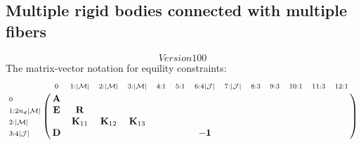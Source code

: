 \documentclass[a4paper,10pt]{article}
\begin{document}
\subsection{Multiple rigid bodies connected with multiple fibers}
\[Version 100\]
The matrix-vector notation for equility constraints:
\begin{equation}\notag
\bordermatrix{
                                        & \scriptstyle{0      }        &   \scriptstyle{1 : |\mathcal{M}|}           &  \scriptstyle{2 : |\mathcal{M}|}           & \scriptstyle{3 : |\mathcal{M}|}            &  \scriptstyle{4 : 1}    & \scriptstyle{5 : 1}    &  \scriptstyle{6:4| \mathcal{J} | }  &  \scriptstyle{7 : | \mathcal{J} |}     &  \scriptstyle{8 : 3} &  \scriptstyle{9:3} & \scriptstyle{10:1}  &  \scriptstyle{11:3}  & \scriptstyle{12:1}  \cr
\scriptstyle{0      }                   &\mathbf{A}                    &                                             &                                            &                                            &                         &                        &                                     &                                        &                      &                    &                     &                      &                     \cr
\scriptstyle{1 : 2n_d|\mathcal{M}|}     &\mathbf{E}                    &   \mathbf{R}                                &                                            &                                            &                         &                        &                                     &                                        &                      &                    &                     &                      &                     \cr
\scriptstyle{2 : |\mathcal{M}|}         &                              &   \mathbf{K}_{11}                           &  \mathbf{K}_{12}                           & \mathbf{K}_{13}                            &                         &                        &                                     &                                        &                      &                    &                     &                      &                     \cr
\scriptstyle{3 : 4| \mathcal{J} | }     &\mathbf{D}                    &                                             &                                            &                                            &                         &                        &  -\mathbf{1}                        &                                        &                      &                    &                     &                      &                     \cr
}
\end{equation}
\end{document}
